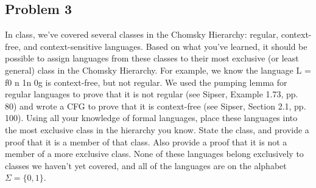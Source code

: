 \documentclass{article}
\begin{document}
    \subsection*{Problem 3}
    In class, we’ve covered several classes in the Chomsky Hierarchy: regular, context-free, and
    context-sensitive languages. Based on what you’ve learned, it should be possible to assign
    languages from these classes to their most exclusive (or least general) class in the Chomsky
    Hierarchy. For example, we know the language L = f0 n 1n 0g is context-free, but not regular.
    We used the pumping lemma for regular languages to prove that it is not regular (see Sipser,
            Example 1.73, pp. 80) and wrote a CFG to prove that it is context-free (see Sipser, Section
                2.1, pp. 100). Using all your knowledge of formal languages, place these languages into the
            most exclusive class in the hierarchy you know. State the class, and provide a proof that it is
            a member of that class. Also provide a proof that it is not a member of a more exclusive
            class. None of these languages belong exclusively to classes we haven’t yet covered, and all
            of the languages are on the alphabet $\Sigma = \{0,1\}$.
\end{document}
